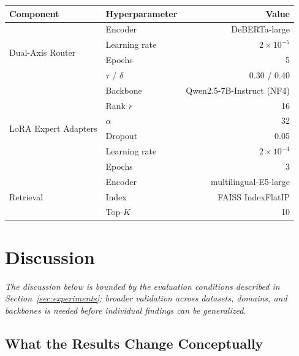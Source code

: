 \documentclass[a4paper,fleql,doubleblind]{cas-sc}
\begin{document}
\vspace{6pt plus 4pt minus 3pt}
\begin{center}
\begingroup
{}
\label{tab:hyperparams_all}
\begin{tabular}{llr}
\toprule
\textbf{Component} & \textbf{Hyperparameter} & \textbf{Value} \\
\midrule
\multirow{4}{*}{Dual-Axis Router}
  & Encoder           & DeBERTa-large \\
  & Learning rate     & $2 \times 10^{-5}$ \\
  & Epochs            & 5 \\
  & $\tau$ / $\delta$ & 0.30 / 0.40 \\
\midrule
\multirow{6}{*}{LoRA Expert Adapters}
  & Backbone        & Qwen2.5-7B-Instruct (NF4) \\
  & Rank $r$        & 16 \\
  & $\alpha$        & 32 \\
  & Dropout         & 0.05 \\
  & Learning rate   & $2 \times 10^{-4}$ \\
  & Epochs          & 3 \\
\midrule
\multirow{3}{*}{Retrieval}
  & Encoder  & multilingual-E5-large \\
  & Index    & FAISS IndexFlatIP \\
  & Top-$K$  & 10 \\
\bottomrule
\end{tabular}
\endgroup
\end{center}
\vspace{6pt plus 4pt minus 3pt}

\section{Discussion}
\label{sec:discussion}

\emph{The discussion below is bounded by the evaluation conditions described in
Section~\ref{sec:experiments}; broader validation across datasets, domains, and
backbones is needed before individual findings can be generalized.}

\subsection{What the Results Change Conceptually}
\end{document}
